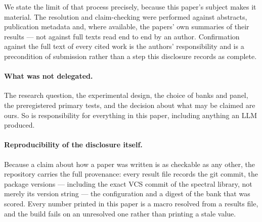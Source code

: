 We state the limit of that process precisely, because this paper's subject makes it material. The
resolution and claim-checking were performed against abstracts, publication metadata and, where
available, the papers' own summaries of their results --- not against full texts read end to end by
an author. Confirmation against the full text of every cited work is the authors' responsibility and
is a precondition of submission rather than a step this disclosure records as complete.

\paragraph{What was not delegated.} The research question, the experimental design, the choice of
banks and panel, the preregistered primary tests, and the decision about what may be claimed are
ours. So is responsibility for everything in this paper, including anything an LLM produced.

\paragraph{Reproducibility of the disclosure itself.} Because a claim about how a paper was written
is as checkable as any other, the repository carries the full provenance: every result file records
the git commit, the package versions --- including the exact VCS commit of the spectral library, not
merely its version string --- the configuration and a digest of the bank that was scored. Every
number printed in this paper is a macro resolved from a results file, and the build fails on an
unresolved one rather than printing a stale value.

